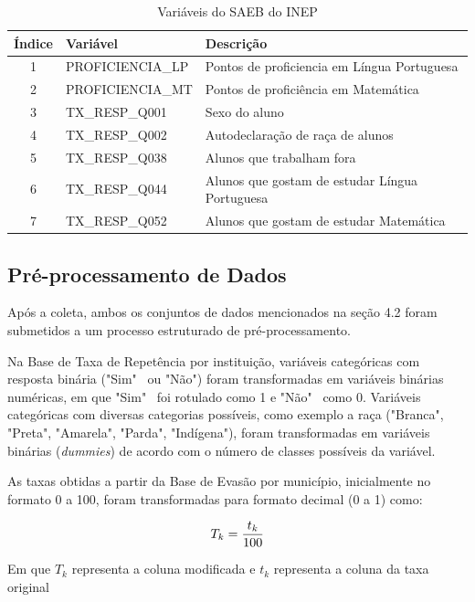 \documentclass[english, spanish, brazilian]{RBIEarticle} %
\begin{document}
\begin{table}[H]
\centering
\begin{tabular}{clp{7cm}}
\hline
\textbf{Índice} & \textbf{Variável} & \textbf{Descrição} \\
\hline
1 & PROFICIENCIA\_LP & Pontos de proficiencia em Língua Portuguesa \\
2 & PROFICIENCIA\_MT & Pontos de proficiência em Matemática  \\
3 & TX\_RESP\_Q001 & Sexo do aluno  \\
4 & TX\_RESP\_Q002 & Autodeclaração de raça de alunos  \\
5 & TX\_RESP\_Q038 & Alunos que trabalham fora  \\
6 & TX\_RESP\_Q044 & Alunos que gostam de estudar Língua Portuguesa  \\
7 & TX\_RESP\_Q052 & Alunos que gostam de estudar Matemática  \\
\hline
\end{tabular}
\caption{Variáveis do SAEB do INEP}
\label{tab:saeb_desc}
\end{table}

\subsection{Pré-processamento de Dados}

Após a coleta, ambos os conjuntos de dados mencionados na seção 4.2 foram submetidos a um processo estruturado de pré-processamento. 

Na Base de Taxa de Repetência por instituição, variáveis categóricas com resposta binária ("Sim" ~ou "Não") foram transformadas em variáveis binárias numéricas, em que "Sim" ~foi rotulado como 1 e "Não" ~como 0. Variáveis categóricas com diversas categorias possíveis, como exemplo a raça ("Branca", "Preta", "Amarela", "Parda", "Indígena"), foram transformadas em variáveis binárias (\textit{dummies}) de acordo com o número de classes possíveis da variável.

As taxas obtidas a partir da Base de Evasão por município, inicialmente no formato 0 a 100, foram transformadas para formato decimal (0 a 1) como:

\vspace{0.5cm}
\begin{equation}
\large T_k = \frac{t_k}{100}
\end{equation}
\vspace{0.5cm}

Em que $T_k$ representa a coluna modificada e $t_k$ representa a coluna da taxa original 
\end{document}
